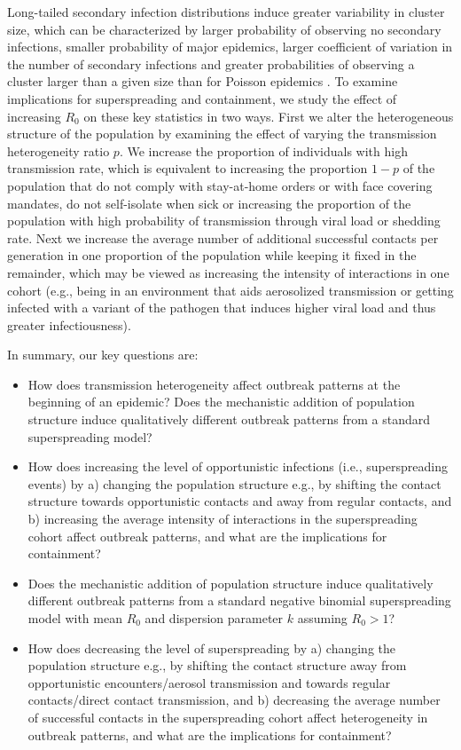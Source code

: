 \documentclass{imammb}
\numberwithin{equation}{section}
\begin{document}
Long-tailed secondary infection distributions induce greater variability in cluster size, which can be characterized by larger probability of observing no secondary infections, smaller probability of major epidemics, larger coefficient of variation in the number of secondary infections and greater probabilities of observing a cluster larger than a given size than for Poisson epidemics \citep{Althouse2020-dn}. To examine implications for superspreading and containment, we study the effect of increasing $R_0$ on these key statistics in two ways. First we alter the heterogeneous structure of the population by examining the effect of varying the transmission heterogeneity ratio $p$. We increase the proportion of individuals with high transmission rate, which is equivalent to increasing the proportion $1 - p$ of the population that do not comply with stay-at-home orders or with face covering mandates, do not self-isolate when sick or increasing the proportion of the population with high probability of transmission through viral load or shedding rate. Next we increase the average number of additional successful contacts per generation in one proportion of the population while keeping it fixed in the remainder, which may be viewed as increasing the intensity of interactions in one cohort (e.g., being in an environment that aids aerosolized transmission or getting infected with a variant of the pathogen that induces higher viral load and thus greater infectiousness). %
 
In summary, our key questions are:
\begin{itemize}
    \item How does transmission heterogeneity affect outbreak patterns at the beginning of an epidemic? Does the mechanistic addition of population structure induce qualitatively different outbreak patterns from a standard superspreading model? 
    \item How does increasing the level of opportunistic infections (i.e., superspreading events) by a) changing the population structure e.g., by shifting the contact structure towards opportunistic contacts and away from regular contacts, and b) increasing the average intensity of interactions in the superspreading cohort affect outbreak patterns, and what are the implications for containment?
    \item Does the mechanistic addition of population structure induce qualitatively different outbreak patterns from a standard negative binomial superspreading model with mean $R_0$ and dispersion parameter $k$ assuming $R_0>1$? 
\item How does decreasing the level of superspreading by a) changing the population structure e.g., by shifting the contact structure away from opportunistic encounters/aerosol transmission and towards regular contacts/direct contact transmission, and b) decreasing the average number of successful contacts in the superspreading cohort affect heterogeneity in outbreak patterns, and what are the implications for containment?
\end{itemize}
\end{document}
